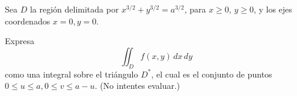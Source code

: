 Sea \( D \) la región delimitada por $x^{3/2} + y^{3/2} = a^{3/2}$, para $x \geq 0$, $y \geq 0$, y los ejes coordenados $x = 0, y = 0$.

Expresa 
\[\iint_D f(x, y) \, dx \, dy\]
como una integral sobre el triángulo $D^*$, el cual es el conjunto de puntos $0 \leq u \leq a, 0 \leq v \leq a-u$. (No intentes evaluar.)
